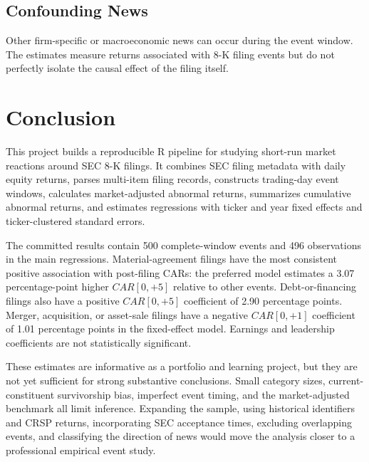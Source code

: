 \documentclass[12pt]{article}
\begin{document}
\subsection{Confounding News}

Other firm-specific or macroeconomic news can occur during the event window. The estimates measure returns associated with 8-K filing events but do not perfectly isolate the causal effect of the filing itself.

\section{Conclusion}

This project builds a reproducible R pipeline for studying short-run market reactions around SEC 8-K filings. It combines SEC filing metadata with daily equity returns, parses multi-item filing records, constructs trading-day event windows, calculates market-adjusted abnormal returns, summarizes cumulative abnormal returns, and estimates regressions with ticker and year fixed effects and ticker-clustered standard errors.

The committed results contain 500 complete-window events and 496 observations in the main regressions. Material-agreement filings have the most consistent positive association with post-filing CARs: the preferred model estimates a 3.07 percentage-point higher $CAR[0,+5]$ relative to other events. Debt-or-financing filings also have a positive $CAR[0,+5]$ coefficient of 2.90 percentage points. Merger, acquisition, or asset-sale filings have a negative $CAR[0,+1]$ coefficient of 1.01 percentage points in the fixed-effect model. Earnings and leadership coefficients are not statistically significant.

These estimates are informative as a portfolio and learning project, but they are not yet sufficient for strong substantive conclusions. Small category sizes, current-constituent survivorship bias, imperfect event timing, and the market-adjusted benchmark all limit inference. Expanding the sample, using historical identifiers and CRSP returns, incorporating SEC acceptance times, excluding overlapping events, and classifying the direction of news would move the analysis closer to a professional empirical event study.
\end{document}
